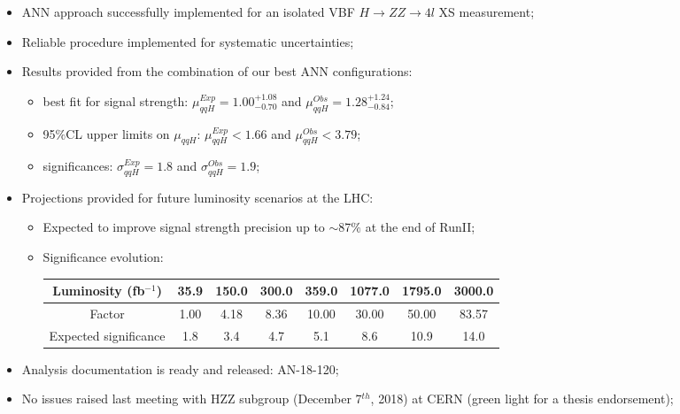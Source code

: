 \begin{itemize}
		\item {\color{blue}ANN approach successfully implemented for an isolated VBF $H \rightarrow ZZ \rightarrow 4l$ XS measurement};
		\item {\color{blue}Reliable} procedure implemented for {\color{blue}systematic uncertainties};
		\item {\color{blue}Results} provided from the combination of our {\color{blue}best ANN configurations}:
		\begin{itemize}
			\justifying
			\item best fit for signal strength: {\color{blue}$\mu_{qqH}^{Exp} = 1.00_{-0.70}^{+1.08}$} and {\color{blue}$\mu_{qqH}^{Obs} = 1.28_{-0.84}^{+1.24}$};
			\item 95$\%$CL upper limits on $\mu_{qqH}$: {\color{blue}$\mu_{qqH}^{Exp} < 1.66$} and {\color{blue}$\mu_{qqH}^{Obs} < 3.79$};
			\item significances: {\color{blue}$\sigma_{qqH}^{Exp} = 1.8$} and {\color{blue}$\sigma_{qqH}^{Obs} = 1.9$};
		\end{itemize}
		\item {\color{blue}Projections} provided for future luminosity scenarios at the LHC:
		\begin{itemize}
			\justifying
			\item Expected to improve signal strength precision up to {\color{blue}$\sim$87$\%$} at the end of RunII;
			\item Significance evolution:\\
			\begin{tabular}{c|c|c|c|c|c|c|c}
				\hline
				Luminosity (fb$^{-1}$) & 35.9 & 150.0 & 300.0 & 359.0 & 1077.0 & 1795.0 & 3000.0\\
				\hline
				Factor                 & 1.00 & 4.18  & 8.36  & 10.00 & 30.00  & 50.00  & 83.57\\
				\hline
				Expected significance  & 1.8  & 3.4   & 4.7   & 5.1   & 8.6    & 10.9   & 14.0\\
				\hline
			\end{tabular}
		\end{itemize}
		\item Analysis documentation is ready and released: {\color{blue}AN-18-120};
		\item {\color{blue}No issues} raised last meeting with HZZ subgroup (December 7$^{th}$, 2018) at CERN (green light for a thesis endorsement);
\end{itemize}